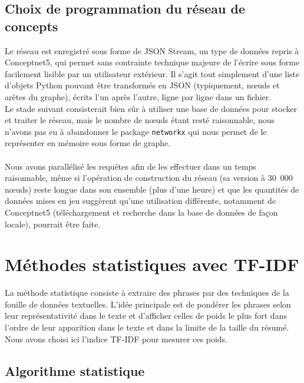 \documentclass[a4paper, 12pt]{article}
\newcommand{\pyt}[1]{\texttt{#1}}%
\begin{document}
\subsection{Choix de programmation du réseau de concepts}

Le réseau est enregistré sous forme de JSON Stream, un type de données repris à Conceptnet5, qui permet sans contrainte technique majeure de l'écrire sous forme facilement lisible par un utilisateur extérieur. Il s'agit tout simplement d'une liste d'objets Python pouvant être transformés en JSON (typiquement, n\oe{}uds et arêtes du graphe), écrits l'un après l'autre, ligne par ligne dans un fichier.\\

Le stade suivant consisterait bien sûr à utiliser une base de données pour stocker et traiter le réseau, mais le nombre de n\oe{}uds étant resté raisonnable, nous n'avons pas eu à abandonner le package \pyt{networkx} qui nous permet de le représenter en mémoire sous forme de graphe.

\paragraph{}
Nous avons parallélisé les requêtes afin de les effectuer dans un temps raisonnable, même si l'opération de construction du réseau (sa version à 30~000 n\oe{}uds) reste longue dans son ensemble (plus d'une heure) et que les quantités de données mises en jeu suggèrent qu'une utilisation différente, notamment de Conceptnet5 (téléchargement et recherche dans la base de données de façon locale), pourrait être faite.



\section{Méthodes statistiques avec TF-IDF}\label{Section:TFIDF}

La méthode statistique consiste à extraire des phrases par des techniques de la fouille de données textuelles. L'idée principale est de pondérer les phrases selon leur représentativité dans le texte et d'afficher celles de poids le plus fort dans l'ordre de leur apparition dans le texte et dans la limite de la taille du résumé. Nous avons choisi ici l'indice TF-IDF pour mesurer ces poids.

\subsection{Algorithme statistique}
\end{document}
